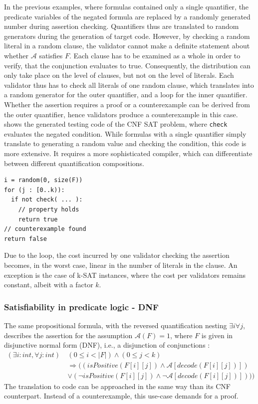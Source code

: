 In the previous examples, where formulas contained only a single quantifier, the predicate variables of the negated formula are replaced by a randomly generated number during assertion checking. Quantifiers thus are translated to random generators during the generation of target code. However, by checking a random literal in a random clause, the validator cannot make a definite statement about whether $\mathcal{A}$ satisfies $F$. Each clause has to be examined as a whole in order to verify, that the conjunction evaluates to true. Consequently, the distribution can only take place on the level of clauses, but not on the level of literals. Each validator thus has to check all literals of one random clause, which translates into a random generator for the outer quantifier, and a loop for the inner quantifier. Whether the assertion requires a proof or a counterexample can be derived from the outer quantifier, hence validators produce a counterexample in this case.  shows the generated testing code of the CNF SAT problem, where \texttt{check} evaluates the negated condition. While formulas with a single quantifier simply translate to generating a random value and checking the condition, this code is more extensive. It requires a more sophisticated compiler, which can differentiate between different quantification compositions.

\begin{lstlisting}[label=lst:cnf_test_code, caption=Test code structure for single nested quantifiers, numbers=none]
i = random(0, size(F))
for (j : [0..k)):
  if not check( ... ):
    // property holds
    return true
// counterexample found
return false
\end{lstlisting}

Due to the loop, the cost incurred by one validator checking the assertion becomes, in the worst case, linear in the number of literals in the clause. An exception is the case of k-SAT instances, where the cost per validators remains constant, albeit with a factor $k$. 

\subsubsection{Satisfiability in predicate logic - DNF}\label{sec:dnf}
The same propositional formula, with the reversed quantification nesting $\exists i \forall j$, describes the assertion for the assumption $\mathcal{A}(F) = 1$, where $F$ is given in disjunctive normal form (DNF), i.e., a disjunction of conjunctions \cite{dnf_math_encycl}:
\begin{equation}\label{eq:dnf_sat}
\begin{aligned}
(\exists i : int, \forall j : int) \: &(0 \leq i < |F|) \wedge (0 \leq j < k) \\
&\Rightarrow ((isPositive(F[i][j]) \wedge \mathcal{A}[decode(F[i][j])]) \\
&\vee (\neg isPositive(F[i][j]) \wedge \neg \mathcal{A}[decode(F[i][j])])))
\end{aligned}
\end{equation}
The translation to code can be approached in the same way than its CNF counterpart. Instead of a counterexample, this use-case demands for a proof.

